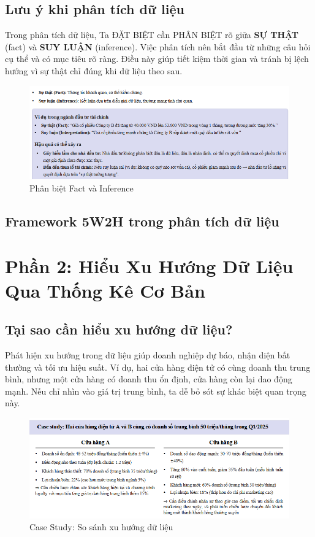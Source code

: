 \documentclass[11pt]{article}
\begin{document}
\subsection{Lưu ý khi phân tích dữ liệu}
Trong phân tích dữ liệu, Ta ĐẶT BIỆT cần PHÂN BIỆT rõ giữa \textbf{SỰ THẬT} (fact) và \textbf{SUY LUẬN} (inference).
Việc phân tích nên bắt đầu từ những câu hỏi cụ thể và có mục tiêu rõ ràng. Điều này giúp tiết kiệm thời gian và tránh bị lệch hướng vì sự thật chỉ đúng khi dữ liệu theo sau.

\begin{figure}[H]
    \centering
    \includegraphics[width=1\linewidth]{images/fact_vs_inference.png}
    \caption{Phân biệt Fact và Inference}
    \label{fig:fact_vs_inference}
\end{figure}

\subsection{Framework 5W2H trong phân tích dữ liệu}
\section{Phần 2: Hiểu Xu Hướng Dữ Liệu Qua Thống Kê Cơ Bản}

\subsection{Tại sao cần hiểu xu hướng dữ liệu?}
Phát hiện xu hướng trong dữ liệu giúp doanh nghiệp dự báo, nhận diện bất thường và tối ưu hiệu suất. Ví dụ, hai cửa hàng điện tử có cùng doanh thu trung bình, nhưng một cửa hàng có doanh thu ổn định, cửa hàng còn lại dao động mạnh. Nếu chỉ nhìn vào giá trị trung bình, ta dễ bỏ sót sự khác biệt quan trọng này.

\begin{figure}[H]
    \centering
    \includegraphics[width=1\linewidth]{images/caseStudy_DataTrending.png}
    \caption{Case Study: So sánh xu hướng dữ liệu}
    \label{fig:Case Study}
\end{figure}
\end{document}

